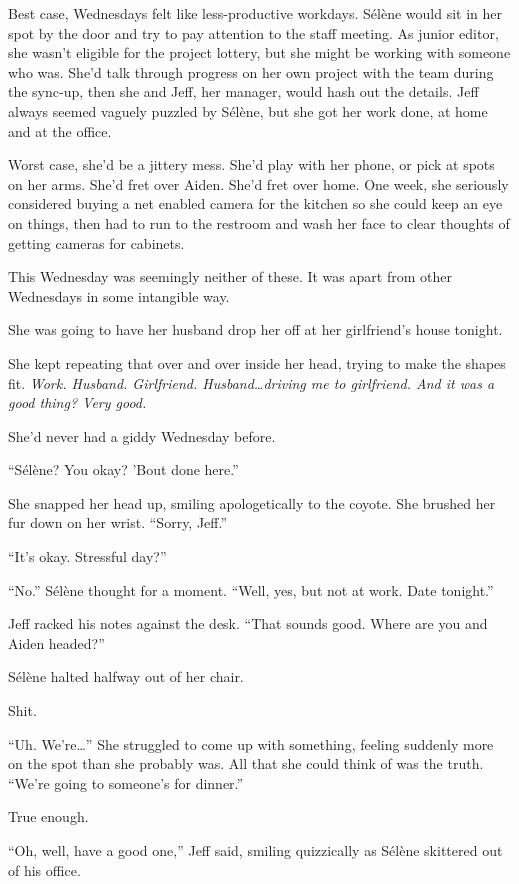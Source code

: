 Best case, Wednesdays felt like less-productive workdays. Sélène would sit in her spot by the door and try to pay attention to the staff meeting. As junior editor, she wasn't eligible for the project lottery, but she might be working with someone who was. She'd talk through progress on her own project with the team during the sync-up, then she and Jeff, her manager, would hash out the details. Jeff always seemed vaguely puzzled by Sélène, but she got her work done, at home and at the office.

Worst case, she'd be a jittery mess. She'd play with her phone, or pick at spots on her arms. She'd fret over Aiden. She'd fret over home. One week, she seriously considered buying a net enabled camera for the kitchen so she could keep an eye on things, then had to run to the restroom and wash her face to clear thoughts of getting cameras for cabinets.

This Wednesday was seemingly neither of these. It was apart from other Wednesdays in some intangible way.

She was going to have her husband drop her off at her girlfriend's house tonight.

She kept repeating that over and over inside her head, trying to make the shapes fit. \emph{Work. Husband. Girlfriend. Husband\ldots{}driving me to girlfriend. And it was a good thing? Very good.}

She'd never had a giddy Wednesday before.

``Sélène? You okay? 'Bout done here.''

She snapped her head up, smiling apologetically to the coyote. She brushed her fur down on her wrist. ``Sorry, Jeff.''

``It's okay. Stressful day?''

``No.'' Sélène thought for a moment. ``Well, yes, but not at work. Date tonight.''

Jeff racked his notes against the desk. ``That sounds good. Where are you and Aiden headed?''

Sélène halted halfway out of her chair.

Shit.

``Uh. We're\ldots{}'' She struggled to come up with something, feeling suddenly more on the spot than she probably was. All that she could think of was the truth. ``We're going to someone's for dinner.''

True enough.

``Oh, well, have a good one,'' Jeff said, smiling quizzically as Sélène skittered out of his office.


